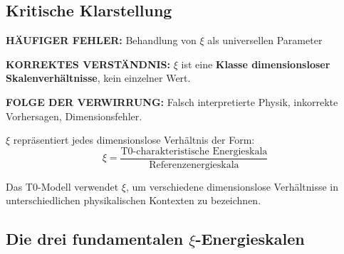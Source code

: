	\subsection{Kritische Klarstellung}
	
	\begin{tcolorbox}[colback=red!10!white,colframe=red!75!black,title=KRITISCHE WARNUNG: $\xi$-Parameter-Verwirrung]
		\textbf{HÄUFIGER FEHLER:} Behandlung von $\xi$ als universellen Parameter
		
		\textbf{KORREKTES VERSTÄNDNIS:} $\xi$ ist eine \textbf{Klasse dimensionsloser Skalenverhältnisse}, kein einzelner Wert.
		
		\textbf{FOLGE DER VERWIRRUNG:} Falsch interpretierte Physik, inkorrekte Vorhersagen, Dimensionsfehler.
		
		$\xi$ repräsentiert jedes dimensionslose Verhältnis der Form:
		\begin{equation}
			\xi = \frac{\text{T0-charakteristische Energieskala}}{\text{Referenzenergieskala}}
		\end{equation}
		
		Das T0-Modell verwendet $\xi$, um verschiedene dimensionslose Verhältnisse in unterschiedlichen physikalischen Kontexten zu bezeichnen.
	\end{tcolorbox}
	
	\subsection{Die drei fundamentalen $\xi$-Energieskalen}
	
	\begin{table}[H]
		\centering
		\caption{Die drei fundamentalen $\xi$-Parametertypen im T0-Modell}
		\label{tab:xi_hierarchy}
		\scriptsize\setlength{\tabcolsep}{3pt}
	\end{table}
	
